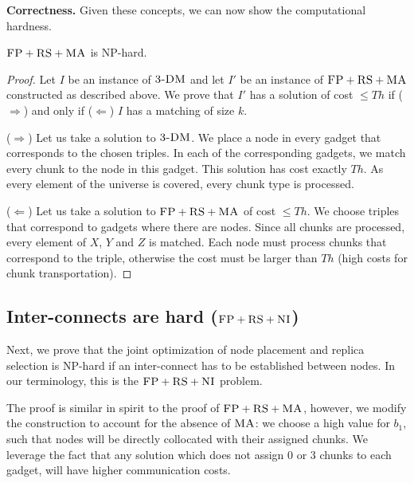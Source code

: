 \documentclass[conference,10pt]{IEEEtran}
\newcommand{\CC}{\textsc{NI}}
\newcommand{\FP}{\textsc{FP}}
\newcommand{\RS}{\textsc{RS}}
\newcommand{\MA}{\textsc{MA}}
\newcommand{\CostTrans}{\ensuremath{b_1}}
\newcommand{\TDM}{\textsc{3-DM}}
\newcommand{\Thr}{\ensuremath{Th}}
\begin{document}
\textbf{Correctness.}
Given these concepts, we can now show the computational hardness.
\begin{theorem}
$\FP+\RS+\MA$ is NP-hard.
\end{theorem}
\begin{proof}
Let $I$ be an instance of $\TDM$ and let $I'$ be an instance of
$\FP+\RS+\MA$ constructed as described above. We prove that $I'$ has a solution of cost $\leq \Thr$ if ($\Rightarrow$) and only if
($\Leftarrow$)
$I$ has a matching of size $k$.

($\Rightarrow$) Let us take a solution to $\TDM$. We place a node in every
gadget that corresponds to the chosen triples. In each of the corresponding
gadgets, we match every chunk to the node in this gadget. This
solution has
cost exactly $\Thr$. As every element of the universe is covered, every
chunk type is processed.

($\Leftarrow$) Let us take a solution to $\FP+\RS+\MA$ of cost $\leq \Thr$. We
choose triples that correspond to gadgets where there are nodes. Since
all chunks are processed, every element of $X$, $Y$ and $Z$ is matched. Each
node must process chunks that
correspond to the triple, otherwise the
cost must be larger than $\Thr$ (high costs for chunk
transportation).
\end{proof}


\subsection{Inter-connects are hard ($\FP+\RS+\CC$)}\label{ssec:fprscc}


Next, we prove that the joint optimization of node placement and replica selection
is NP-hard if an inter-connect has to be established between nodes.
In our terminology, this is the $\FP+\RS+\CC$ problem.

The proof is similar in spirit to the proof of $\FP+\RS+\MA$, however,
we modify the construction to account for the absence of $\MA$:
we choose
a high value for $\CostTrans$, such that nodes will be directly collocated with
their assigned chunks. We leverage the fact that any solution which does not
assign 0 or 3 chunks to each gadget, will have higher communication costs.
\end{document}
